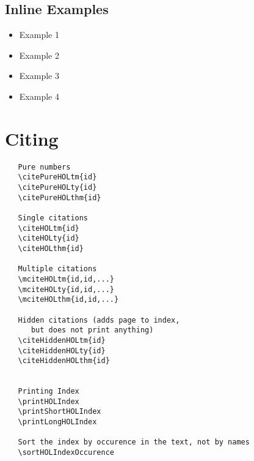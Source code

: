 \documentclass{article}
\begin{document}
\subsection{Inline Examples}
\begin{itemize}
\item Example 1 
\item Example 2 
\item Example 3 
\item Example 4 
\end{itemize}



\section{Citing}

\begin{verbatim}
   Pure numbers
   \citePureHOLtm{id}
   \citePureHOLty{id}
   \citePureHOLthm{id}

   Single citations
   \citeHOLtm{id}
   \citeHOLty{id}
   \citeHOLthm{id}

   Multiple citations 
   \mciteHOLtm{id,id,...}
   \mciteHOLty{id,id,...}
   \mciteHOLthm{id,id,...}

   Hidden citations (adds page to index, 
      but does not print anything)
   \citeHiddenHOLtm{id}
   \citeHiddenHOLty{id}
   \citeHiddenHOLthm{id}


   Printing Index 
   \printHOLIndex
   \printShortHOLIndex 
   \printLongHOLIndex 

   Sort the index by occurence in the text, not by names
   \sortHOLIndexOccurence
\end{verbatim}



\pagebreak


\pagebreak


\pagebreak


\pagebreak
\end{document}
